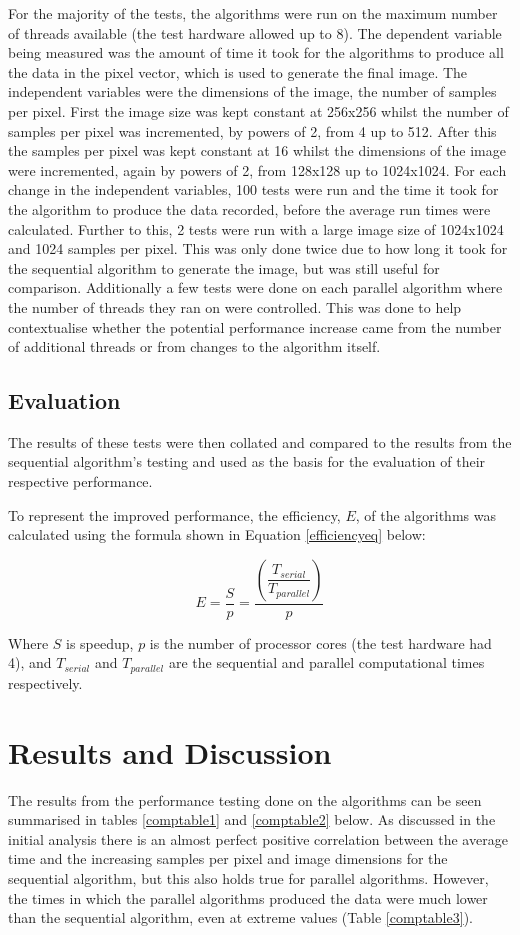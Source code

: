 \documentclass[12pt,journal,transmag]{IEEEtran}
\begin{document}
	For the majority of the tests, the algorithms were run on the maximum number of threads available (the test hardware allowed up to 8). The dependent variable being measured was the amount of time it took for the algorithms to produce all the data in the pixel vector, which is used to generate the final image. The independent variables were the dimensions of the image, the number of samples per pixel. First the image size was kept constant at 256x256 whilst the number of samples per pixel was incremented, by powers of 2, from 4 up to 512. After this the samples per pixel was kept constant at 16 whilst the dimensions of the image were incremented, again by powers of 2, from 128x128 up to 1024x1024. For each change in the independent variables, 100 tests were run and the time it took for the algorithm to produce the data recorded, before the average run times were calculated. Further to this, 2 tests were run with a large image size of 1024x1024 and 1024 samples per pixel. This was only done twice due to how long it took for the sequential algorithm to generate the image, but was still useful for comparison. Additionally a few tests were done on each parallel algorithm where the number of threads they ran on were controlled. This was done to help contextualise whether the potential performance increase came from the number of additional threads or from changes to the algorithm itself.
	
	\subsection{Evaluation}
	The results of these tests were then collated and compared to the results from the sequential algorithm's testing and used as the basis for the evaluation of	their respective performance.
	
	To represent the improved performance, the efficiency, $E$, of the algorithms was calculated using the formula shown in Equation \ref{efficiencyeq} below:
	
	\begin{equation} \label{efficiencyeq} 
	E = \dfrac{S}{p} = \dfrac{(\dfrac{T_{serial}}{T_{parallel}})}{p}
	\end{equation}
	
	Where $S$ is speedup, $p$ is the number of processor cores (the test hardware had 4), and $T_{serial}$ and $T_{parallel}$ are the sequential and parallel computational times respectively.
	
	\section{Results and Discussion}
	The results from the performance testing done on the algorithms can be seen summarised in tables \ref{comptable1} and \ref{comptable2} below. As discussed in the initial analysis there is an almost perfect positive correlation between the average time and the increasing samples per pixel and image dimensions for the sequential algorithm, but this also holds true for parallel algorithms. However, the times in which the parallel algorithms produced the data were much lower than the sequential algorithm, even at extreme values (Table \ref{comptable3}).
	
\end{document}
